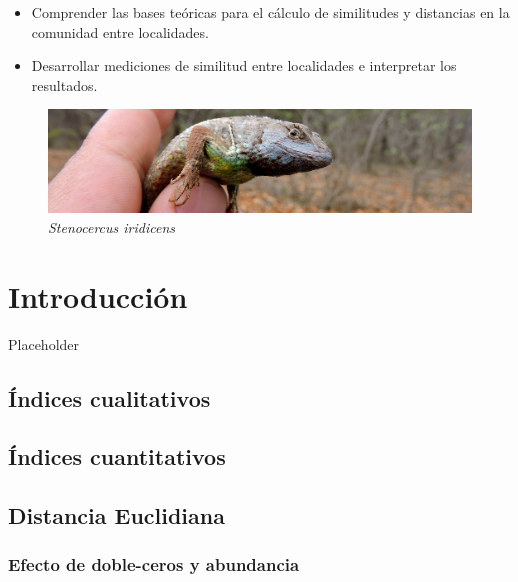 \documentclass[
]{book}
\providecommand{\tightlist}{%
  \setlength{\itemsep}{0pt}\setlength{\parskip}{0pt}}
\begin{document}
\begin{itemize}
\tightlist
\item
  Comprender las bases teóricas para el cálculo de similitudes y distancias en la comunidad entre localidades.
\item
  Desarrollar mediciones de similitud entre localidades e interpretar los resultados.
\end{itemize}

\begin{figure}
\centering
\includegraphics{lagar.jpg}
\caption{\emph{Stenocercus iridicens}}
\end{figure}

\hypertarget{introducciuxf3n}{%
\chapter{Introducción}\label{introducciuxf3n}}

Placeholder

\hypertarget{uxedndices-cualitativos}{%
\section{Índices cualitativos}\label{uxedndices-cualitativos}}

\hypertarget{uxedndices-cuantitativos}{%
\section{Índices cuantitativos}\label{uxedndices-cuantitativos}}

\hypertarget{distancia-euclidiana}{%
\section{Distancia Euclidiana}\label{distancia-euclidiana}}

\hypertarget{efecto-de-doble-ceros-y-abundancia}{%
\subsection{Efecto de doble-ceros y abundancia}\label{efecto-de-doble-ceros-y-abundancia}}
\end{document}
